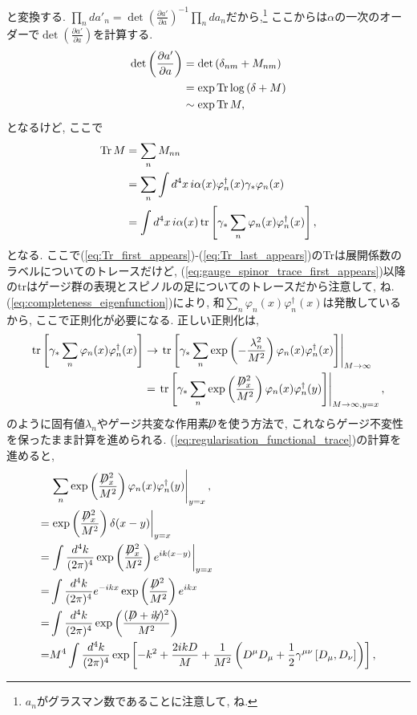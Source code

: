 \documentclass{ltjsarticle}
\theoremstyle{definition}
\def\slash#1{\!\!\not\!\!#1}
\def\dsla{\,\slash{D}}
\begin{document}
と変換する. $\displaystyle\prod_nda'_n=\det\left(\frac{\partial a'}{\partial a}\right)^{-1}\prod_nda_n$だから,\footnote{$a_n$がグラスマン数であることに注意して, ね.} ここからは$\alpha$の一次のオーダーで$\displaystyle\det\left(\frac{\partial a'}{\partial a}\right)$を計算する.
\begin{align}
  \det\left(\frac{\partial a'}{\partial a}\right)&=\det\left(\delta_{nm}+M_{nm}\right)\\
  &=\exp\Tr\log\left(\delta+M\right)\label{eq:Tr_first_appears}\\
  &\sim\exp\Tr M,\label{eq:exp_tr_m}
\end{align}
となるけど, ここで
\begin{align}
  \Tr M&=\sum_nM_{nn}\label{eq:Tr_last_appears}\\
  &=\sum_n\int d^4x\,i\alpha(x)\varphi_n^\dagger(x)\gamma_\ast\varphi_n(x)\\
  &=\int d^4x\,i\alpha(x)\tr\left[\gamma_\ast\sum_n\varphi_n(x)\varphi_n^\dagger(x)\right],\label{eq:gauge_spinor_trace_first_appears}
\end{align}
となる. ここで(\ref{eq:Tr_first_appears})-(\ref{eq:Tr_last_appears})のTrは展開係数のラベルについてのトレースだけど, (\ref{eq:gauge_spinor_trace_first_appears})以降のtrはゲージ群の表現とスピノルの足についてのトレースだから注意して, ね. (\ref{eq:completeness_eigenfunction})により, 和$\sum_n\varphi_n(x)\varphi_n^\dagger(x)$は発散しているから, ここで正則化が必要になる. 正しい正則化は,
\begin{align}
  \tr\left[\gamma_\ast\sum_n\varphi_n(x)\varphi_n^\dagger(x)\right]&\to\left.\tr\left[\gamma_\ast\sum_n\exp\left(-\frac{\lambda_n^2}{M^2}\right)\varphi_n(x)\varphi_n^\dagger(x)\right]\right|_{M\to\infty}\\&=\left.\tr\left[\gamma_\ast\sum_n\exp\left(\frac{\dsla_x^2}{M^2}\right)\varphi_n(x)\varphi_n^\dagger(y)\right]\right|_{M\to\infty, y=x},\label{eq:regularisation_functional_trace}
\end{align}
のように固有値$\lambda_n$やゲージ共変な作用素$\dsla$を使う方法で, これならゲージ不変性を保ったまま計算を進められる. (\ref{eq:regularisation_functional_trace})の計算を進めると,
\begin{align}
  &\left.\sum_n\exp\left(\frac{\dsla_x^2}{M^2}\right)\varphi_n(x)\varphi_n^\dagger(y)\right|_{y=x},\\
  =&\left.\exp\left(\frac{\dsla_x^2}{M^2}\right)\delta(x-y)\right|_{y=x}\\
  =&\left.\int\frac{d^4k}{(2\pi)^4}\exp\left(\frac{\dsla_x^2}{M^2}\right)e^{ik(x-y)}\right|_{y=x}\\
  =&\int\frac{d^4k}{(2\pi)^4}e^{-ikx}\exp\left(\frac{\dsla^2}{M^2}\right)e^{ikx}\\
  =&\int\frac{d^4k}{(2\pi)^4}\exp\left(\frac{(\,\dsla+i\slash k)^2}{M^2}\right)\\
  =&M^4\int\frac{d^4k}{(2\pi)^4}\exp\left[-k^2+\frac{2ikD}M+\frac1{M^2}\left(D^\mu D_\mu+\frac12\gamma^{\mu\nu}\left[D_\mu,D_\nu\right]\right)\right],\label{eq:anomaly_calculation_expression1}
\end{align}
\end{document}
